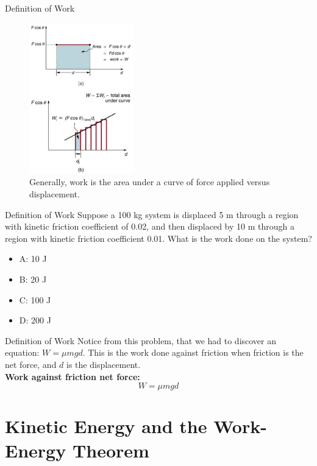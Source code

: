\documentclass{beamer}
\begin{document}
\begin{frame}{Definition of Work}
\begin{figure}
\centering
\includegraphics[width=0.4\textwidth]{figures/area.png}
\caption{\label{fig:area} Generally, work is the area under a curve of force applied versus displacement.}
\end{figure}
\end{frame}

\begin{frame}{Definition of Work}
Suppose a 100 kg system is displaced 5 m through a region with kinetic friction coefficient of 0.02, and then displaced by 10 m through a region with kinetic friction coefficient 0.01.  What is the work done on the system?
\begin{itemize}
\item A: 10 J
\item B: 20 J
\item C: 100 J
\item D: 200 J
\end{itemize}
\end{frame}

\begin{frame}{Definition of Work}
Notice from this problem, that we had to discover an equation: $W = \mu m g d$.  This is the work done against friction when friction is the net force, and $d$ is the displacement. \\ \vspace{1cm}
\textbf{Work against friction net force:}
\begin{equation}
W = \mu m g d
\end{equation}
\end{frame}

\section{Kinetic Energy and the Work-Energy Theorem}
\end{document}
